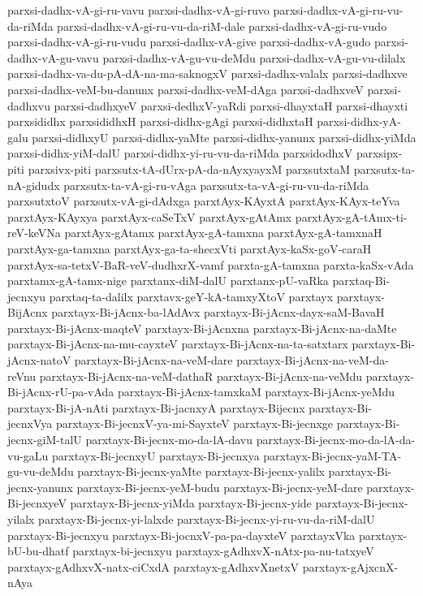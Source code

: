 {parxsi-dadhx-vA-gi-ru-vavu
parxsi-dadhx-vA-gi-ruvo
parxsi-dadhx-vA-gi-ru-vu-da-riMda
parxsi-dadhx-vA-gi-ru-vu-da-riM-dale
parxsi-dadhx-vA-gi-ru-vudo
parxsi-dadhx-vA-gi-ru-vudu
parxsi-dadhx-vA-give
parxsi-dadhx-vA-gudo
parxsi-dadhx-vA-gu-vavu
parxsi-dadhx-vA-gu-vu-deMdu
parxsi-dadhx-vA-gu-vu-dilalx
parxsi-dadhx-va-du-pA-dA-na-ma-saknogxV
parxsi-dadhx-valalx
parxsi-dadhxve
parxsi-dadhx-veM-bu-danunx
parxsi-dadhx-veM-dAga
parxsi-dadhxveV
parxsi-dadhxvu
parxsi-dadhxyeV
parxsi-dedhxV-yaRdi
parxsi-dhayxtaH
parxsi-dhayxti
parxsididhx
parxsididhxH
parxsi-didhx-gAgi
parxsi-didhxtaH
parxsi-didhx-yA-galu
parxsi-didhxyU
parxsi-didhx-yaMte
parxsi-didhx-yanunx
parxsi-didhx-yiMda
parxsi-didhx-yiM-dalU
parxsi-didhx-yi-ru-vu-da-riMda
parxsidodhxV
parxsipx-piti
parxsivx-piti
parxsutx-tA-dUrx-pA-da-nAyxyayxM
parxsutxtaM
parxsutx-ta-nA-gidudx
parxsutx-ta-vA-gi-ru-vAga
parxsutx-ta-vA-gi-ru-vu-da-riMda
parxsutxtoV
parxsutx-vA-gi-dAdxga
parxtAyx-KAyxtA
parxtAyx-KAyx-teYva
parxtAyx-KAyxya
parxtAyx-caSeTxV
parxtAyx-gAtAmx
parxtAyx-gA-tAmx-ti-reV-keVNa
parxtAyx-gAtamx
parxtAyx-gA-tamxna
parxtAyx-gA-tamxnaH
parxtAyx-ga-tamxna
parxtAyx-ga-ta-shecxVti
parxtAyx-kaSx-goV-caraH
parxtAyx-sa-tetxV-BaR-veV-dudhxrX-vamf
parxta-gA-tamxna
parxta-kaSx-vAda
parxtamx-gA-tamx-nige
parxtanx-diM-dalU
parxtanx-pU-vaRka
parxtaq-Bi-jecnxyu
parxtaq-ta-dalilx
parxtavx-geY-kA-tamxyXtoV
parxtayx
parxtayx-BijAcnx
parxtayx-Bi-jAcnx-ba-lAdAvx
parxtayx-Bi-jAcnx-dayx-saM-BavaH
parxtayx-Bi-jAcnx-maqteV
parxtayx-Bi-jAcnxna
parxtayx-Bi-jAcnx-na-daMte
parxtayx-Bi-jAcnx-na-mu-cayxteV
parxtayx-Bi-jAcnx-na-ta-satxtarx
parxtayx-Bi-jAcnx-natoV
parxtayx-Bi-jAcnx-na-veM-dare
parxtayx-Bi-jAcnx-na-veM-da-reVnu
parxtayx-Bi-jAcnx-na-veM-dathaR
parxtayx-Bi-jAcnx-na-veMdu
parxtayx-Bi-jAcnx-rU-pa-vAda
parxtayx-Bi-jAcnx-tamxkaM
parxtayx-Bi-jAcnx-yeMdu
parxtayx-Bi-jA-nAti
parxtayx-Bi-jacnxyA
parxtayx-Bijecnx
parxtayx-Bi-jecnxVya
parxtayx-Bi-jecnxV-ya-mi-SayxteV
parxtayx-Bi-jecnxge
parxtayx-Bi-jecnx-giM-talU
parxtayx-Bi-jecnx-mo-da-lA-davu
parxtayx-Bi-jecnx-mo-da-lA-da-vu-gaLu
parxtayx-Bi-jecnxyU
parxtayx-Bi-jecnxya
parxtayx-Bi-jecnx-yaM-TA-gu-vu-deMdu
parxtayx-Bi-jecnx-yaMte
parxtayx-Bi-jecnx-yalilx
parxtayx-Bi-jecnx-yanunx
parxtayx-Bi-jecnx-yeM-budu
parxtayx-Bi-jecnx-yeM-dare
parxtayx-Bi-jecnxyeV
parxtayx-Bi-jecnx-yiMda
parxtayx-Bi-jecnx-yide
parxtayx-Bi-jecnx-yilalx
parxtayx-Bi-jecnx-yi-lalxde
parxtayx-Bi-jecnx-yi-ru-vu-da-riM-dalU
parxtayx-Bi-jecnxyu
parxtayx-Bi-jocnxV-pa-pa-dayxteV
parxtayxVka
parxtayx-bU-bu-dhatf
parxtayx-bi-jecnxyu
parxtayx-gAdhxvX-nAtx-pa-nu-tatxyeV
parxtayx-gAdhxvX-natx-ciCxdA
parxtayx-gAdhxvXnetxV
parxtayx-gAjxcnX-nAya
}
